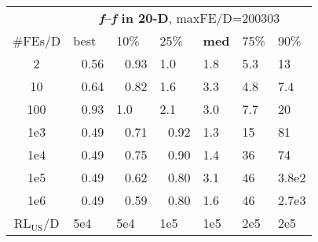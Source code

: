 \begin{tabular}{c|llllll}
 & \multicolumn{6}{|c}{\textbf{\textit{f}\raisebox{-0.35ex}{1}--\textit{f}\raisebox{-0.35ex}{24} in 20-D}, maxFE/D=200303}\\
\#FEs/D & best & 10\% & 25\% & \textbf{med} & 75\% & 90\%\\
2 & ~\,0.56 & ~\,0.93 & \hspace*{1ex}1.0 & \hspace*{1ex}1.8 & \hspace*{1ex}5.3 & 13\\
10 & ~\,0.64 & ~\,0.82 & \hspace*{1ex}1.6 & \hspace*{1ex}3.3 & \hspace*{1ex}4.8 & \hspace*{1ex}7.4\\
100 & ~\,0.93 & \hspace*{1ex}1.0 & \hspace*{1ex}2.1 & \hspace*{1ex}3.0 & \hspace*{1ex}7.7 & 20\\
1e3 & ~\,0.49 & ~\,0.71 & ~\,0.92 & \hspace*{1ex}1.3 & 15 & 81\\
1e4 & ~\,0.49 & ~\,0.75 & ~\,0.90 & \hspace*{1ex}1.4 & 36 & 74\\
1e5 & ~\,0.49 & ~\,0.62 & ~\,0.80 & \hspace*{1ex}3.1 & 46 & 3.8e2\\
1e6 & ~\,0.49 & ~\,0.59 & ~\,0.80 & \hspace*{1ex}1.6 & 46 & 2.7e3\\
$\text{RL}_{\text{US}}$/D & 5e4 & 5e4 & 1e5 & 1e5 & 2e5 & 2e5
\end{tabular}
